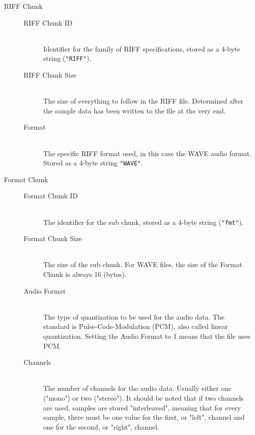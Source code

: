 \documentclass[12pt,twoside]{report}
\begin{document}
\begin{description}

  \item[RIFF Chunk] \hfill

  \begin{description}

    \item[RIFF Chunk ID] \hfill \\ Identifier for the family of RIFF specifications, stored as a 4-byte string (\texttt{"RIFF"}).

    \item[RIFF Chunk Size] \hfill \\ The size of everything to follow in the RIFF file. Determined after the sample data has been written to the file at the very end.

    \item[Format] \hfill \\ The specific RIFF format used, in this case the WAVE audio format. Stored as a 4-byte string \texttt{"WAVE"}.

  \end{description}

  \item[Format Chunk] \hfill

  \begin{description}

    \item[Format Chunk ID] \hfill \\ The identifier for the sub chunk, stored as a 4-byte string (\texttt{"fmt"}).

    \item[Format Chunk Size] \hfill \\ The size of the sub chunk. For WAVE files, the size of the Format Chunk is always 16 (bytes).

    \item[Audio Format] \hfill \\ The type of quantization to be used for the audio data. The standard is Pulse-Code-Modulation (PCM), also called linear quantization. Setting the Audio Format to 1 means that the file uses PCM.

    \item[Channels] \hfill \\ The number of channels for the audio data. Usually either one ("mono") or two ("stereo"). It should be noted that if two channels are used, samples are stored "interleaved", meaning that for every sample, there must be one value for the first, or "left", channel and one for the second, or "right", channel.


\end{description}
\end{description}
\end{document}
